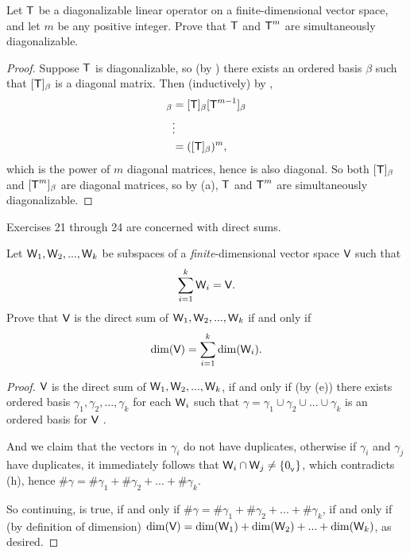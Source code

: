 \begin{exercise} \label{exercise 5.2.20}
Let \(\textsf{T}\) be a diagonalizable linear operator on a finite-dimensional vector space, and let \(m\) be any positive integer.
Prove that \(\textsf{T}\) and \(\textsf{T}^m\) are simultaneously diagonalizable.
\end{exercise}

\begin{proof}
Suppose \(\textsf{T}\) is diagonalizable, so (by ) there exists an ordered basis \(\beta\) such that \([\textsf{T}]_{\beta}\) is a diagonal matrix.
Then (inductively) by ,
\begin{align*}
    [\T^m]_{\beta} & = [\T]_{\beta} [\T^{m - 1}]_{\beta} \\
        & \vdots \\
        & = ([\T]_{\beta})^m,
\end{align*}
which is the power of \(m\) diagonal matrices, hence is also diagonal.
So both \([\textsf{T}]_{\beta}\) and \([\textsf{T}^m]_{\beta}\) are diagonal matrices, so by (a), \(\textsf{T}\) and \(\textsf{T}^m\) are simultaneously diagonalizable.
\end{proof}

Exercises 21 through 24 are concerned with direct sums.

\begin{exercise} \label{exercise 5.2.21}
Let \(\textsf{W}_1, \textsf{W}_2, ..., \textsf{W}_k\) be subspaces of a \emph{finite}-dimensional vector space \(\textsf{V}\) such that
\[
    \sum_{i = 1}^k \textsf{W}_i = \textsf{V}.
\]
Prove that \(\textsf{V}\) is the direct sum of \(\textsf{W}_1, \textsf{W}_2, ..., \textsf{W}_k\) if and only if
\[
    \dim(\textsf{V}) = \sum_{i = 1}^k \dim(\textsf{W}_i).
\]
\end{exercise}

\begin{proof}
\(\textsf{V}\) is the direct sum of \(\textsf{W}_1, \textsf{W}_2, ..., \textsf{W}_k\),
if and only if (by (e)) there exists ordered basis \(\gamma_1, \gamma_2, ..., \gamma_k\) for each \(\textsf{W}_i\) such that \(\gamma = \gamma_1 \cup \gamma_2 \cup ... \cup \gamma_k\) is an ordered basis for \(\textsf{V}\) .

And we claim that the vectors in \(\gamma_i\) do not have duplicates, otherwise if \(\gamma_i\) and \(\gamma_j\) have duplicates, it immediately follows that \(\textsf{W}_i \cap \textsf{W}_j \ne \{ 0_{_{\textsf{V}}} \}\), which contradicts (h), hence \(\#\gamma = \#\gamma_1 + \#\gamma_2 + ... + \#\gamma_k\).

So continuing,  is true, if and only if \(\#\gamma = \#\gamma_1 + \#\gamma_2 + ... + \#\gamma_k\),
if and only if (by definition of dimension) \(\dim(\textsf{V}) = \dim(\textsf{W}_1) + \dim(\textsf{W}_2) + ... + \dim(\textsf{W}_k)\), as desired.
\end{proof}

